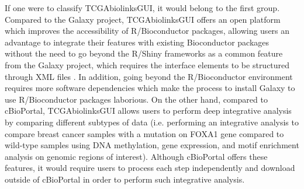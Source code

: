 If one were to classify TCGAbiolinksGUI, it would belong to the first group. Compared to the Galaxy project, TCGAbiolinksGUI offers an open platform which improves the accessibility of R/Bioconductor packages, allowing users an advantage to integrate their features with existing Bioconductor packages without the need to go beyond the R/Shiny frameworks as a common feature from the Galaxy project, which requires the interface elements to be structured through XML files \cite{10.12688/f1000research.9821.1}.
In addition, going beyond the R/Bioconductor environment requires more software dependencies which make the process to install Galaxy to use R/Bioconductor packages laborious.
On the other hand, compared to cBioPortal, TCGAbiolinksGUI allows users to perform deep integrative analysis by comparing different subtypes of data (i.e. performing an integrative analysis to compare breast cancer samples with a mutation on FOXA1 gene compared to wild-type samples using DNA methylation, gene expression, and motif enrichment analysis on genomic regions of interest). Although cBioPortal offers these features, it would require users to process each step independently and download outside of cBioPortal in order to perform such integrative analysis.
